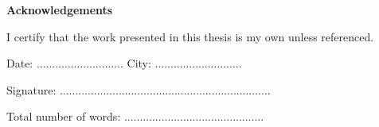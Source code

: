 \vspace*{\fill}

\vspace{1cm}
\begin{flushleft}

\large
\textbf{Acknowledgements}








\vspace{1cm}

I certify that the work presented in this thesis is my own unless referenced.


\vspace{0.5cm}

Date: ............................
\hspace{1cm} 
City: ............................ 

\vspace{0.5cm}
Signature: ....................................................................

\vspace{0.5cm}
Total number of words: .............................................

\end{flushleft}

\vspace*{\fill}
\pagebreak